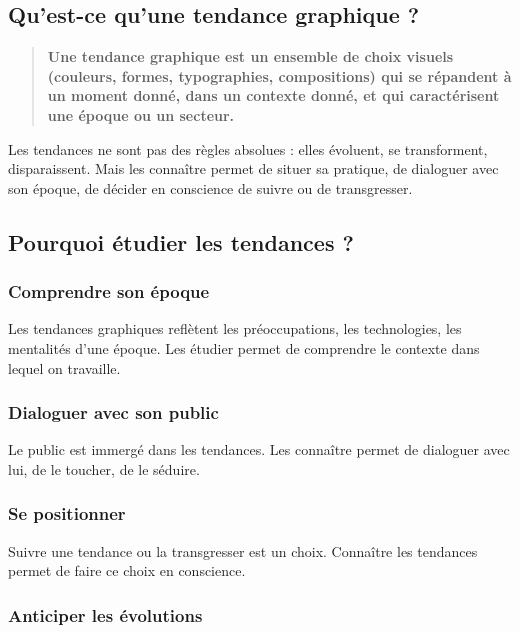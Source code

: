\subsection{Qu'est-ce qu'une tendance graphique ?}

\begin{quote}
\textbf{Une tendance graphique est un ensemble de choix visuels (couleurs, formes, typographies, compositions) qui se répandent à un moment donné, dans un contexte donné, et qui caractérisent une époque ou un secteur.}
\end{quote}

Les tendances ne sont pas des règles absolues : elles évoluent, se transforment, disparaissent. Mais les connaître permet de situer sa pratique, de dialoguer avec son époque, de décider en conscience de suivre ou de transgresser.

\subsection{Pourquoi étudier les tendances ?}

\subsubsection{Comprendre son époque}

Les tendances graphiques reflètent les préoccupations, les technologies, les mentalités d'une époque. Les étudier permet de comprendre le contexte dans lequel on travaille.

\subsubsection{Dialoguer avec son public}

Le public est immergé dans les tendances. Les connaître permet de dialoguer avec lui, de le toucher, de le séduire.

\subsubsection{Se positionner}

Suivre une tendance ou la transgresser est un choix. Connaître les tendances permet de faire ce choix en conscience.

\subsubsection{Anticiper les évolutions}

